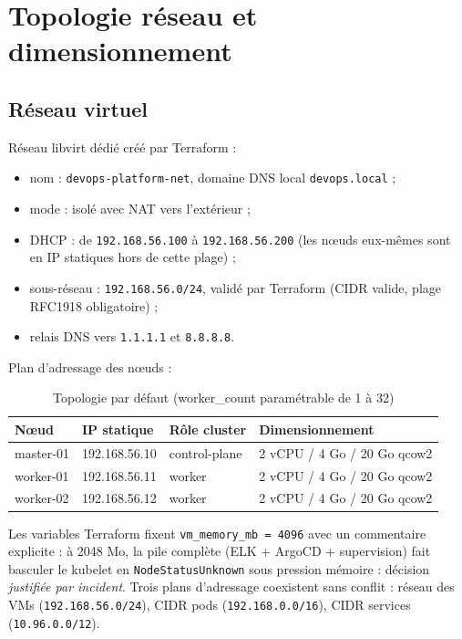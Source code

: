 \documentclass[12pt,a4paper,oneside]{report}
\begin{document}
\section{Topologie réseau et dimensionnement}

\subsection{Réseau virtuel}
Réseau libvirt dédié créé par Terraform :

\begin{itemize}[itemsep=1pt]
  \item nom : \texttt{devops-platform-net}, domaine DNS local \texttt{devops.local} ;
  \item mode : isolé avec NAT vers l'extérieur ;
  \item DHCP : de \texttt{192.168.56.100} à \texttt{192.168.56.200} (les nœuds eux-mêmes sont en IP statiques hors de cette plage) ;
  \item sous-réseau : \texttt{192.168.56.0/24}, validé par Terraform (CIDR valide, plage RFC1918 obligatoire) ;
  \item relais DNS vers \texttt{1.1.1.1} et \texttt{8.8.8.8}.
\end{itemize}

Plan d'adressage des nœuds :

\begin{table}[h!]
\centering
\begin{tabular}{@{}llll@{}}
\toprule
\textbf{Nœud} & \textbf{IP statique} & \textbf{Rôle cluster} & \textbf{Dimensionnement} \\
\midrule
master-01 & 192.168.56.10 & control-plane & 2 vCPU / 4 Go / 20 Go qcow2 \\
worker-01 & 192.168.56.11 & worker & 2 vCPU / 4 Go / 20 Go qcow2 \\
worker-02 & 192.168.56.12 & worker & 2 vCPU / 4 Go / 20 Go qcow2 \\
\bottomrule
\end{tabular}
\caption{Topologie par défaut (worker\_count paramétrable de 1 à 32)}
\end{table}

Les variables Terraform fixent \texttt{vm\_memory\_mb = 4096} avec un commentaire explicite : à 2048 Mo, la pile complète (ELK + ArgoCD + supervision) fait basculer le kubelet en \texttt{NodeStatusUnknown} sous pression mémoire : décision \emph{justifiée par incident}. Trois plans d'adressage coexistent sans conflit : réseau des VMs (\texttt{192.168.56.0/24}), CIDR pods (\texttt{192.168.0.0/16}), CIDR services (\texttt{10.96.0.0/12}).
\end{document}

